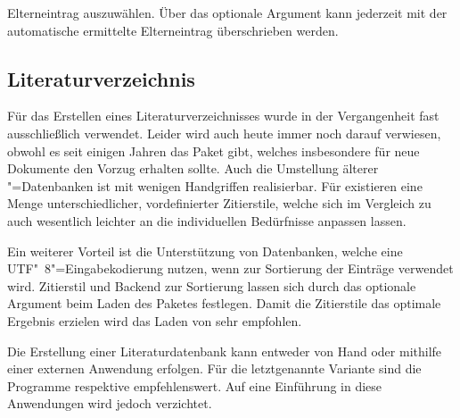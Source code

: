 \documentclass[%
  english,ngerman,%
  cdgeometry=no,DIV=12,%
  cd=false,cdfont=false,cdtitle=true,%
  headings=normal,%
  automark,%
  listof=toc,%
]{tudscrartcl}
\begin{document}
Elterneintrag auszuwählen. Über das optionale Argument kann jederzeit mit 
 der automatische ermittelte 
Elterneintrag überschrieben werden.
%
\begin{Hint}
\newcommand*\symbollettergroup{}
\newcommand*{\newformulasymbol}[5][]{%
  \ifisgreeksymbol{#4}{%
    \renewcommand*{\symbollettergroup}{greekletters}%
  }{%
    \renewcommand*{\symbollettergroup}{romanletters}%
  }%
  \newglossaryentry{#2}{%
    type=symbols,%
    name={#3},%
    description={\nopostdesc},%
    symbol={\ensuremath{#4}},%
    user1={\ensuremath{\mathrm{#5}}},%
    sort={#2},%
    parent={\symbollettergroup},%
    #1%
  }%
}
\end{Hint}



\subsection{%
  Literaturverzeichnis%
  \label{sec:biblatex}%
}

Für das Erstellen eines Literaturverzeichnisses wurde in der Vergangenheit fast 
ausschließlich  verwendet. Leider wird auch heute immer noch 
darauf verwiesen, obwohl es seit einigen Jahren das Paket  
gibt, welches insbesondere für neue Dokumente den Vorzug erhalten sollte. Auch 
die Umstellung älterer "=Datenbanken ist mit wenigen 
Handgriffen realisierbar. Für  existieren eine Menge 
unterschiedlicher, vordefinierter Zitierstile, welche sich im Vergleich zu 
 auch wesentlich leichter an die individuellen Bedürfnisse 
anpassen lassen.

Ein weiterer Vorteil ist die Unterstützung von Datenbanken, welche eine 
UTF"~8"=Eingabekodierung nutzen, wenn  zur Sortierung der 
Einträge verwendet wird. Zitierstil und Backend zur Sortierung lassen sich 
durch das optionale Argument beim Laden des Paketes festlegen. Damit die 
Zitierstile das optimale Ergebnis erzielen wird das Laden von 
 sehr empfohlen.
%
\begin{Preamble}
\usepackage{csquotes}
\usepackage[backend=biber,style=alphabetic]{biblatex}

\end{Preamble}
%
Die Erstellung einer Literaturdatenbank kann entweder von Hand oder mithilfe 
einer externen Anwendung erfolgen. Für die letztgenannte Variante sind die 
Programme  respektive  empfehlenswert. 
Auf eine Einführung in diese Anwendungen wird jedoch verzichtet. 
\end{document}
